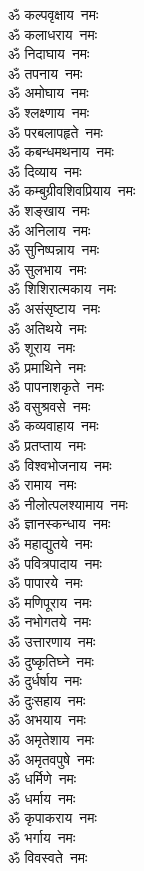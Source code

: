 \begin{multicols}{2}
\begin{flushleft}
ॐ कल्पवृक्षाय~नमः\\
ॐ कलाधराय~नमः\\
ॐ निदाघाय~नमः\\
ॐ तपनाय~नमः\\
ॐ अमोघाय~नमः\\
ॐ श्लक्ष्णाय~नमः\\
ॐ परबलापहृते~नमः\\
ॐ कबन्धमथनाय~नमः\hfill{}\\
ॐ दिव्याय~नमः\\
ॐ कम्बुग्रीवशिवप्रियाय~नमः\\
ॐ शङ्खाय~नमः\\
ॐ अनिलाय~नमः\\
ॐ सुनिष्पन्नाय~नमः\\
ॐ सुलभाय~नमः\\
ॐ शिशिरात्मकाय~नमः\\
ॐ असंसृष्टाय~नमः\\
ॐ अतिथये~नमः\\
ॐ शूराय~नमः\hfill{}\\
ॐ प्रमाथिने~नमः\\
ॐ पापनाशकृते~नमः\\
ॐ वसुश्रवसे~नमः\\
ॐ कव्यवाहाय~नमः\\
ॐ प्रतप्ताय~नमः\\
ॐ विश्वभोजनाय~नमः\\
ॐ रामाय~नमः\\
ॐ नीलोत्पलश्यामाय~नमः\\
ॐ ज्ञानस्कन्धाय~नमः\\
ॐ महाद्युतये~नमः\hfill{}\\
ॐ पवित्रपादाय~नमः\\
ॐ पापारये~नमः\\
ॐ मणिपूराय~नमः\\
ॐ नभोगतये~नमः\\
ॐ उत्तारणाय~नमः\\
ॐ दुष्कृतिघ्ने~नमः\\
ॐ दुर्धर्षाय~नमः\\
ॐ दुःसहाय~नमः\\
ॐ अभयाय~नमः\\
ॐ अमृतेशाय~नमः\hfill{}\\
ॐ अमृतवपुषे~नमः\\
ॐ धर्मिणे~नमः\\
ॐ धर्माय~नमः\\
ॐ कृपाकराय~नमः\\
ॐ भर्गाय~नमः\\
ॐ विवस्वते~नमः\\

\end{flushleft}
\end{multicols}
